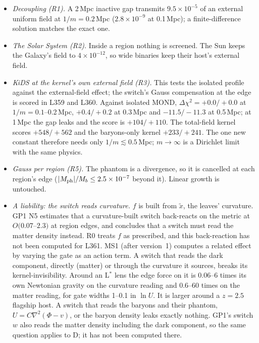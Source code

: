 \documentclass[10pt]{article}
\begin{document}
\begin{itemize}
\item \emph{Decoupling (R1).} A 2\,Mpc inactive gap transmits $9.5\times10^{-5}$ of an external uniform field at $1/m=0.2$\,Mpc ($2.8\times10^{-9}$ at 0.1\,Mpc); a finite-difference solution matches the exact one.
\item \emph{The Solar System (R2).} Inside a region nothing is screened. The Sun keeps the Galaxy's field to $4\times10^{-12}$, so wide binaries keep their host's external field.
\item \emph{KiDS at the kernel's own external field (R3).} This tests the isolated profile against the external-field effect; the switch's Gauss compensation at the edge is scored in L359 and L360. Against isolated MOND, $\Delta\chi^2=+0.0/+0.0$ at $1/m=0.1$--0.2\,Mpc, $+0.4/+0.2$ at 0.3\,Mpc and $-11.5/-11.3$ at 0.5\,Mpc; at 1\,Mpc the gap leaks and the score is $+104/+110$. The total-field kernel scores $+548/+562$ and the baryons-only kernel $+233/+241$. The one new constant therefore needs only $1/m\lesssim0.5$\,Mpc; $m\to\infty$ is a Dirichlet limit with the same physics.
\item \emph{Gauss per region (R5).} The phantom is a divergence, so it is cancelled at each region's edge ($|M_{\rm ph}|/M_b\leq2.5\times10^{-7}$ beyond it). Linear growth is untouched.
\item \emph{A liability: the switch reads curvature.} $f$ is built from $\tilde x$, the leaves' curvature. GP1 N5 estimates that a curvature-built switch back-reacts on the metric at $O(0.07$--$2.3)$ at region edges, and concludes that a switch must read the matter density instead. R0 treats $f$ as prescribed, and this back-reaction has not been computed for L361. MS1 (after version~1) computes a related effect by varying the gate as an action term. A switch that reads the dark component, directly (matter) or through the curvature it sources, breaks its kernel-invisibility. Around an L$^*$ lens the edge force on it is 0.06--6 times its own Newtonian gravity on the curvature reading and 0.6--60 times on the matter reading, for gate widths 1--0.1 in $\ln U$. It is larger around a $z=2.5$ flagship host. A switch that reads the baryons and their phantom, $U=C\nabla^2(\Phi-v)$, or the baryon density leaks exactly nothing. GP1's switch $w$ also reads the matter density including the dark component, so the same question applies to D; it has not been computed there.

\end{itemize}
\end{document}
